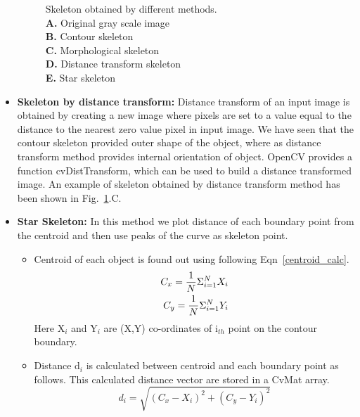 \begin{itemize}
\begin{figure}[!b]
\caption{Skeleton obtained by different methods.\\
 \textbf{A.} Original gray scale image\\
 \textbf{B.} Contour skeleton\\
 \textbf{C.} Morphological skeleton\\
 \textbf{D.} Distance transform skeleton\\
 \textbf{E.} Star skeleton}
\label{skeletons}
\end{figure}
\item \textbf{Skeleton by distance transform:} Distance transform of an
 input image is obtained by creating a new image where pixels are
 set to a value equal to the distance to the nearest zero value
 pixel in input image. We have seen that the contour skeleton
 provided outer shape of the object, where as distance transform
 method provides internal orientation of object. OpenCV provides
 a function cvDistTransform, which can be used to build a
 distance transformed image. An example of skeleton obtained by
 distance transform method has been shown in
 Fig.~\ref{skeletons}.C.
\item \textbf{Star Skeleton:} In this method we plot distance of each
 boundary point from the centroid and then use peaks of the curve
 as skeleton point.
\begin{itemize}
\item Centroid of each object is found out using following
 Eqn~\ref{centroid_calc}.
 \begin{eqnarray}
 C_x = {1 \over N} \Sigma ^N _{i = 1} X_i \label{centroid_calc}
\nonumber \\
 C_y = {1 \over N} \Sigma ^N _{i = 1} Y_i 
 \end{eqnarray}
Here X$_i$ and Y$_i$ are (X,Y) co-ordinates of i$_{th}$ point on the contour
boundary.
\item Distance d$_i$ is calculated between centroid and each boundary
 point as follows. This calculated distance vector are stored in a
 CvMat array.
 \begin{equation}
 d_i = \sqrt{(C_x - X_i)^2 + (C_y - Y_i)^2} \label{dist_calc}
 \end{equation}


\end{itemize}
\end{itemize}
